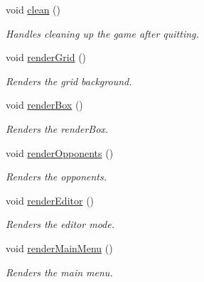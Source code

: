 \begin{DoxyCompactItemize}
\mbox{\label{class_tool_a72f31d307cede1c5b87d49f185f5dfad}} 
void \mbox{\hyperlink{class_tool_a72f31d307cede1c5b87d49f185f5dfad}{clean}} ()
\begin{DoxyCompactList}\small\item\em Handles cleaning up the game after quitting. \end{DoxyCompactList}\item 
\mbox{\label{class_tool_ae3e327ea22b5280908a0250a31ec8066}} 
void \mbox{\hyperlink{class_tool_ae3e327ea22b5280908a0250a31ec8066}{render\+Grid}} ()
\begin{DoxyCompactList}\small\item\em Renders the grid background. \end{DoxyCompactList}\item 
\mbox{\label{class_tool_ad30aa108027b7473a331826aebe400bc}} 
void \mbox{\hyperlink{class_tool_ad30aa108027b7473a331826aebe400bc}{render\+Box}} ()
\begin{DoxyCompactList}\small\item\em Renders the render\+Box. \end{DoxyCompactList}\item 
\mbox{\label{class_tool_af169259746db4b9b0bc8b003db05bb0b}} 
void \mbox{\hyperlink{class_tool_af169259746db4b9b0bc8b003db05bb0b}{render\+Opponents}} ()
\begin{DoxyCompactList}\small\item\em Renders the opponents. \end{DoxyCompactList}\item 
\mbox{\label{class_tool_aa71046861f2e29c7355fed760e1d52b3}} 
void \mbox{\hyperlink{class_tool_aa71046861f2e29c7355fed760e1d52b3}{render\+Editor}} ()
\begin{DoxyCompactList}\small\item\em Renders the editor mode. \end{DoxyCompactList}\item 
\mbox{\label{class_tool_abf50e16bc87fed0a2dfeacd672812a32}} 
void \mbox{\hyperlink{class_tool_abf50e16bc87fed0a2dfeacd672812a32}{render\+Main\+Menu}} ()
\begin{DoxyCompactList}\small\item\em Renders the main menu. \end{DoxyCompactList}\item 

\end{DoxyCompactItemize}
